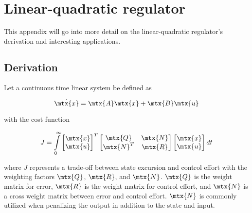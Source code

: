 
\chapter{Linear-quadratic regulator}
\label{ch:deriv_lqr}

This appendix will go into more detail on the linear-quadratic regulator's
derivation and interesting applications.

\section{Derivation}

Let a continuous time linear \gls{system} be defined as

\begin{equation}
  \dot{\mtx{x}} = \mtx{A}\mtx{x} + \mtx{B}\mtx{u}
\end{equation}

with the cost function

\begin{equation*}
  J = \int\limits_0^\infty
    \begin{bmatrix}
      \mtx{x} \\
      \mtx{u}
    \end{bmatrix}^T
    \begin{bmatrix}
      \mtx{Q} & \mtx{N} \\
      \mtx{N}^T & \mtx{R}
    \end{bmatrix}
    \begin{bmatrix}
      \mtx{x} \\
      \mtx{u}
    \end{bmatrix} dt
\end{equation*}

where $J$ represents a trade-off between \gls{state} excursion and
\gls{control effort} with the weighting factors $\mtx{Q}$, $\mtx{R}$, and
$\mtx{N}$. $\mtx{Q}$ is the weight matrix for \gls{error}, $\mtx{R}$ is the
weight matrix for \gls{control effort}, and $\mtx{N}$ is a cross weight matrix
between \gls{error} and \gls{control effort}. $\mtx{N}$ is commonly utilized
when penalizing the output in addition to the state and input.

